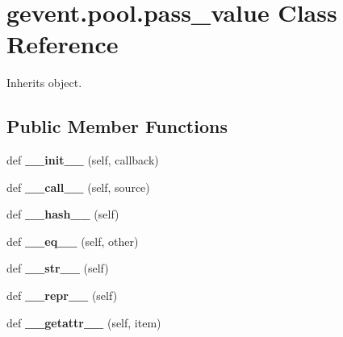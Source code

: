 \hypertarget{classgevent_1_1pool_1_1pass__value}{}\section{gevent.\+pool.\+pass\+\_\+value Class Reference}
\label{classgevent_1_1pool_1_1pass__value}


Inherits object.

\subsection*{Public Member Functions}
\begin{DoxyCompactItemize}
\item 
\mbox{\label{classgevent_1_1pool_1_1pass__value_aa45b8e46e3f052d302c260f32a7188bb}} 
def {\bfseries \+\_\+\+\_\+init\+\_\+\+\_\+} (self, callback)
\item 
\mbox{\label{classgevent_1_1pool_1_1pass__value_a846b877052865684ba0ac686c84c2d39}} 
def {\bfseries \+\_\+\+\_\+call\+\_\+\+\_\+} (self, source)
\item 
\mbox{\label{classgevent_1_1pool_1_1pass__value_ac6acb4850f9e7bbab55bc58e711e9ad9}} 
def {\bfseries \+\_\+\+\_\+hash\+\_\+\+\_\+} (self)
\item 
\mbox{\label{classgevent_1_1pool_1_1pass__value_a5da1a4f9400c24e9ebfdb700fcb9a98d}} 
def {\bfseries \+\_\+\+\_\+eq\+\_\+\+\_\+} (self, other)
\item 
\mbox{\label{classgevent_1_1pool_1_1pass__value_a3b7251bfb5df04cf35cf9950eef68b97}} 
def {\bfseries \+\_\+\+\_\+str\+\_\+\+\_\+} (self)
\item 
\mbox{\label{classgevent_1_1pool_1_1pass__value_a403326ee53f0495031b841d707ce9c93}} 
def {\bfseries \+\_\+\+\_\+repr\+\_\+\+\_\+} (self)
\item 
\mbox{\label{classgevent_1_1pool_1_1pass__value_a1b22f6b2cccde159f84e46f1c00d13c7}} 
def {\bfseries \+\_\+\+\_\+getattr\+\_\+\+\_\+} (self, item)
\end{DoxyCompactItemize}
